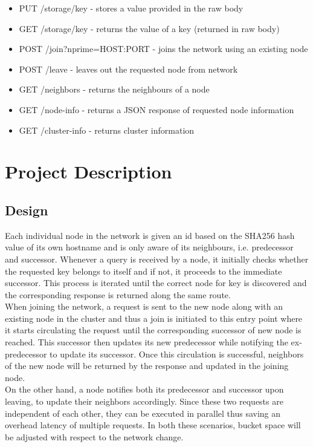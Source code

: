 \documentclass[
    a4paper,
    twocolumn,
]{article}
\begin{document}
\begin{itemize}
	\item PUT /storage/key - stores a value provided in the raw body
	\item GET /storage/key - returns the value of a key (returned in raw body)
	\item POST /join?nprime=HOST:PORT - joins the network using an existing node
	\item POST /leave - leaves out the requested node from network
	\item GET /neighbors - returns the neighbours of a node
	\item GET /node-info - returns a JSON response of requested node information
	\item GET /cluster-info - returns cluster information
\end{itemize}

\section{Project Description}
\subsection{Design}

Each individual node in the network is given an id based on the SHA256 hash value of its own hostname and is only aware of its neighbours, i.e. predecessor and successor. Whenever a query is received by a node, it initially checks whether the requested key belongs to itself and if not, it proceeds to the immediate successor. This process is iterated until the correct node for key is discovered and the corresponding response is returned along the same route.\\

When joining the network, a request is sent to the new node along with an existing node in the cluster and thus a join is initiated to this entry point where it starts circulating the request until the corresponding successor of new node is reached. This successor then updates its new predecessor while notifying the ex-predecessor to update its successor. Once this circulation is successful, neighbors of the new node will be returned by the response and updated in the joining node.\\

On the other hand, a node notifies both its predecessor and successor upon leaving, to update their neighbors accordingly. Since these two requests are independent of each other, they can be executed in parallel thus saving an overhead latency of multiple requests. In both these scenarios, bucket space will be adjusted with respect to the network change. \\
\end{document}
